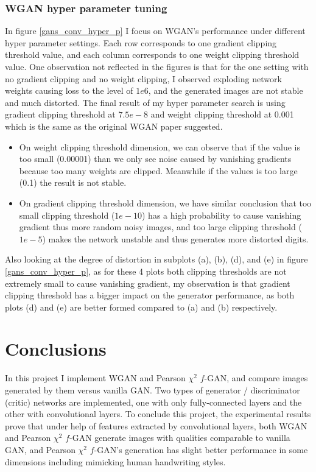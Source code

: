 \documentclass[10pt,twocolumn,letterpaper]{article}
\begin{document}
\subsubsection{WGAN hyper parameter tuning}
\label{wgan_hyper_parameter_tuning}

In figure \ref{gans_conv_hyper_p} I focus on WGAN's performance under different hyper parameter settings. Each row corresponds to one gradient clipping threshold value, and each column corresponds to one weight clipping threshold value. One observation not reflected in the figures is that for the one setting with no gradient clipping and no weight clipping, I observed exploding network weights causing loss to the level of $1e6$, and the generated images are not stable and much distorted. The final result of my hyper parameter search is using gradient clipping threshold at $7.5e-8$ and weight clipping threshold at 0.001 which is the same as the original WGAN paper suggested. 

\begin{itemize}
    \item On weight clipping threshold dimension, we can observe that if the value is too small (0.00001) than we only see noise caused by vanishing gradients because too many weights are clipped. Meanwhile if the values is too large (0.1) the result is not stable. 
    \item On gradient clipping threshold dimension, we have similar conclusion that too small clipping threshold ($1e-10$) has a high probability to cause vanishing gradient thus more random noisy images, and too large clipping threshold ($1e-5$) makes the network unstable and thus generates more distorted digits.
\end{itemize}

Also looking at the degree of distortion in subplots (a), (b), (d), and (e) in figure \ref{gans_conv_hyper_p}, as for these 4 plots both clipping thresholds are not extremely small to cause vanishing gradient, my observation is that gradient clipping threshold has a bigger impact on the generator performance, as both plots (d) and (e) are better formed compared to (a) and (b) respectively. 





\section{Conclusions}
\label{conclusions}
In this project I implement WGAN and Pearson $\chi^2$ $f$-GAN, and compare images generated by them versus vanilla GAN. Two types of generator / discriminator (critic) networks are implemented, one with only fully-connected layers and the other with convolutional layers. To conclude this project, the experimental results prove that under help of features extracted by convolutional layers, both WGAN and Pearson $\chi^2$ $f$-GAN generate images with qualities comparable to vanilla GAN, and Pearson $\chi^2$ $f$-GAN's generation has slight better performance in some dimensions including mimicking human handwriting styles. 
\end{document}

